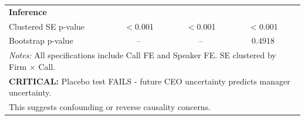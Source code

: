 \documentclass[11pt]{article}
\begin{document}
\begin{table}[htbp]
\begin{tabular}{lcccccc}
\midrule
\textbf{Inference} \\
Clustered SE p-value & $<$0.001 &  & $<$0.001 &  & $<$0.001 &  \\
Bootstrap p-value & -- &  & -- &  & 0.4918 &  \\
\bottomrule
\multicolumn{7}{l}{\parbox{\linewidth}{\footnotesize \textit{Notes:} All specifications include Call FE and Speaker FE. SE clustered by Firm $\times$ Call.}} \\
\multicolumn{7}{l}{\parbox{\linewidth}{\footnotesize \textbf{CRITICAL:} Placebo test FAILS - future CEO uncertainty predicts manager uncertainty.}} \\
\multicolumn{7}{l}{\parbox{\linewidth}{\footnotesize This suggests confounding or reverse causality concerns.}} \\
\end{tabular}
\end{table}
\end{document}
